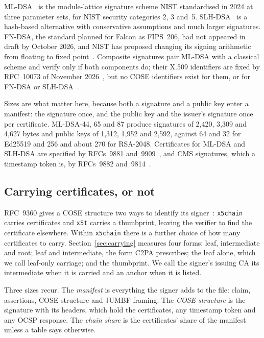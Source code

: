ML-DSA~\cite{fips204} is the module-lattice signature scheme NIST
standardised in 2024 at three parameter sets, for NIST security categories 2,
3 and~5. SLH-DSA~\cite{fips205} is a hash-based alternative
with conservative assumptions and much larger signatures. FN-DSA, the
standard planned for Falcon as FIPS~206, had not appeared in draft by
October 2026, and NIST has proposed changing its signing arithmetic from
floating to fixed point~\cite{nist_fips206_status,nist_fips206_plan}.
Composite signatures pair ML-DSA with a classical scheme and verify only if
both components do; their X.509 identifiers are fixed by RFC~10073 of November
2026~\cite{ounsworth2026composite}, but no COSE identifiers exist for them, or
for FN-DSA or SLH-DSA~\cite{iana_cose,coseFalcon}.

Sizes are what matter here, because both a signature and a public key enter a
manifest: the signature once, and the public key and the issuer's signature
once per certificate. ML-DSA-44, 65 and 87 produce signatures of 2,420, 3,309
and 4,627 bytes and public keys of 1,312, 1,952 and 2,592, against 64 and 32
for Ed25519 and 256 and about 270 for RSA-2048. Certificates for ML-DSA and
SLH-DSA are specified by RFCs~9881 and~9909~\cite{rfc9881,rfc9909}, and CMS
signatures, which a timestamp token is, by RFCs~9882 and~9814~\cite{rfc9882,%
rfc9814}.

\subsection{Carrying certificates, or not}

RFC~9360 gives a COSE structure two ways to identify its
signer~\cite{rfc9360}: \texttt{x5chain} carries certificates and \texttt{x5t}
carries a thumbprint, leaving the verifier to find the certificate elsewhere.
Within \texttt{x5chain} there is a further choice of how many certificates to
carry. Section~\ref{sec:carrying} measures four forms: leaf, intermediate and
root; leaf and intermediate, the form C2PA prescribes; the leaf alone, which
we call leaf-only carriage; and the thumbprint. We call the signer's issuing
CA its intermediate when it is carried and an anchor when it is listed.

Three sizes recur. The \emph{manifest} is everything the signer adds to the
file: claim, assertions, COSE structure and JUMBF framing. The \emph{COSE
structure} is the signature with its headers, which hold the certificates, any
timestamp token and any OCSP response. The \emph{chain share} is the
certificates' share of the manifest unless a table says otherwise.

